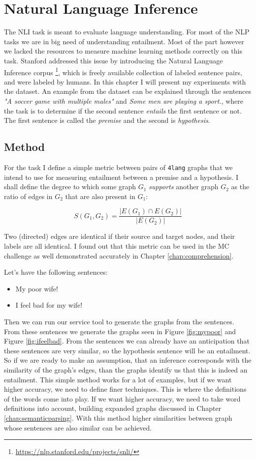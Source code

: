 \chapter{Natural Language Inference}
\label{chap:nli}

The NLI task is meant to evaluate language understanding. 
For most of the NLP tasks we are in big need of understanding entailment. Most of the part however we lacked the resources to measure machine learning methods correctly on this task. Stanford addressed this issue by introducing the Natural Language Inference corpus \footnote{\url{https://nlp.stanford.edu/projects/snli/}}, which is freely available collection of labeled sentence pairs, and were labeled by humans. In this chapter I will present my experiments with the dataset. An example from the dataset can be explained through the sentences \textit{"A soccer game with multiple males" } and 
\textit{Some men are playing a sport.}, where the task is to determine if the second sentence \textit{entails} the first sentence or not. The first sentence is called the \textit{premise} and the second is \textit{hypothesis}.

\section{Method}
For the task I define a simple metric between pairs of \texttt{4lang} graphs that
we intend to use for measuring entailment between a premise and a
hypothesis. I shall define the degree to which some graph $G_1$
\textit{supports} another graph $G_2$ as the ratio of edges in $G_2$
that are also present in $G_1$:

\[ S(G_1, G_2) =\frac{|E(G_1)\cap E(G_2)|}{|E(G_2)|}\]

Two (directed) edges are identical if their source
and target nodes, and their labels are all identical. I found out that this metric can be used in the MC challenge as well demonstrated accurately in Chapter \ref{chap:comprehension}.

Let's have the following sentences:
\begin{itemize}
	\item My poor wife!
	\item I feel bad for my wife!
\end{itemize}
Then we can run our service tool to generate the graphs from the sentences. From these sentences we generate the graphs seen in Figure \ref{fig:mypoor} and Figure \ref{fig:ifeelbad}. From the sentences we can already have an anticipation that these sentences are very similar, so the hypothesis sentence will be an entailment. So if we are ready to make an assumption, that an inference corresponds with the similarity of the graph's edges, than the graphs identify us that this is indeed an entailment. This simple method works for a lot of examples, but if we want higher accuracy, we need to define finer techniques. This is where the definitions of the words come into play. If we want higher accuracy, we need to take word definitions into account, building expanded graphs discussed in Chapter \ref{chap:semanticparsing}. With this method higher similarities between graph whose sentences are also similar can be achieved.

